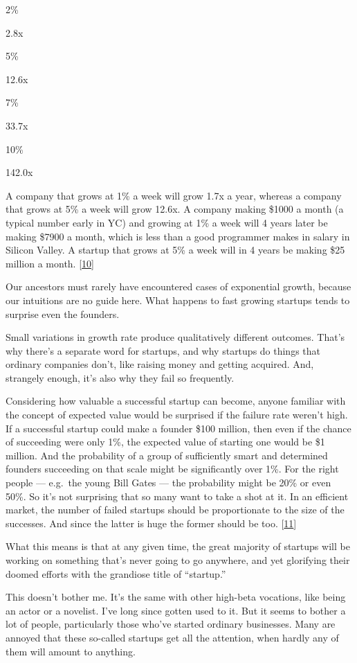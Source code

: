 2\%

2.8x

5\%

12.6x

7\%

33.7x

10\%

142.0x

A company that grows at 1\% a week will grow 1.7x a year, whereas a
company that grows at 5\% a week will grow 12.6x. A company making
\$1000 a month (a typical number early in YC) and growing at 1\% a week
will 4 years later be making \$7900 a month, which is less than a good
programmer makes in salary in Silicon Valley. A startup that grows at
5\% a week will in 4 years be making \$25 million a month.
{[}\hyperref[f10n]{10}{]}

Our ancestors must rarely have encountered cases of exponential growth,
because our intuitions are no guide here. What happens to fast growing
startups tends to surprise even the founders.

Small variations in growth rate produce qualitatively different
outcomes. That's why there's a separate word for startups, and why
startups do things that ordinary companies don't, like raising money and
getting acquired. And, strangely enough, it's also why they fail so
frequently.

Considering how valuable a successful startup can become, anyone
familiar with the concept of expected value would be surprised if the
failure rate weren't high. If a successful startup could make a founder
\$100 million, then even if the chance of succeeding were only 1\%, the
expected value of starting one would be \$1 million. And the probability
of a group of sufficiently smart and determined founders succeeding on
that scale might be significantly over 1\%. For the right people ---
e.g.~the young Bill Gates --- the probability might be 20\% or even
50\%. So it's not surprising that so many want to take a shot at it. In
an efficient market, the number of failed startups should be
proportionate to the size of the successes. And since the latter is huge
the former should be too. {[}\hyperref[f11n]{11}{]}

What this means is that at any given time, the great majority of
startups will be working on something that's never going to go anywhere,
and yet glorifying their doomed efforts with the grandiose title of
``startup.''

This doesn't bother me. It's the same with other high-beta vocations,
like being an actor or a novelist. I've long since gotten used to it.
But it seems to bother a lot of people, particularly those who've
started ordinary businesses. Many are annoyed that these so-called
startups get all the attention, when hardly any of them will amount to
anything.


